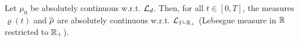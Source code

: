 %	
%

\begin{lemma}\label{le-abs}
	Let $\mu_0$ be absolutely continuous w.r.t. $\mathcal{L}_d$. Then, for all $t\in [0,T]$, the measures $\varrho(t)$ and $\overline\rho$ are absolutely
	continuous w.r.t. $\mathcal{L}_1\llcorner_{\mathbb{R}_+}$ (Lebesgue measure in $\mathbb{R}$ restricted to $\mathbb{R}_+$).
\end{lemma}

